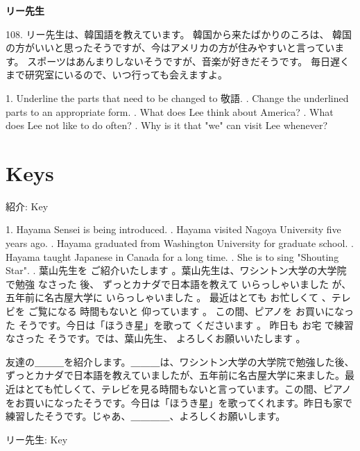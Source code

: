 \begin{center}
 \textbf{リー先生 }
\end{center}

\par{108.  リー先生は、韓国語を教えています。 韓国から来たばかりのころは、 \hfill\break
 韓国の方がいいと思ったそうですが、今はアメリカの方が住みやすいと言っています。 \hfill\break
 スポーツはあんまりしないそうですが、音楽が好きだそうです。 \hfill\break
 毎日遅くまで研究室にいるので、いつ行っても会えますよ。 }

\par{1. Underline the parts that need to be changed to 敬語. \hfill{}. Change the underlined parts to an appropriate form. \hfill{}. What does Lee think about America? \hfill{}. What does Lee not like to do often? \hfill{}. Why is it that "we" can visit Lee whenever? }
      
\section{Keys}
 
\par{紹介: Key }

\par{1. Hayama Sensei is being introduced. \hfill{}. Hayama visited Nagoya University five years ago. \hfill{}. Hayama graduated from Washington University for graduate school. \hfill{}. Hayama taught Japanese in Canada for a long time. \hfill{}. She is to sing "Shouting Star". \hfill{}.  葉山先生を ご紹介いたします 。葉山先生は、ワシントン大学の大学院で勉強 なさった 後、 \hfill\break
 ずっとカナダで日本語を教えて いらっしゃいました が、五年前に名古屋大学に いらっしゃいました 。 \hfill\break
 最近はとても お忙しくて 、テレビを ご覧になる 時間もないと 仰っています 。 \hfill\break
 この間、ピアノを お買いになった そうです。今日は「ほうき星」を歌って くださいます 。 \hfill\break
 昨日も お宅 で練習 なさった そうです。では、葉山先生、 よろしくお願いいたします 。 }

\par{友達の＿＿＿を紹介します。＿＿＿は、ワシントン大学の大学院で勉強した後、ずっとカナダで日本語を教えていましたが、五年前に名古屋大学に来ました。最近はとても忙しくて、テレビを見る時間もないと言っています。この間、ピアノをお買いになったそうです。今日は「ほうき星」を歌ってくれます。昨日も家で練習したそうです。じゃあ、＿＿＿＿、よろしくお願いします。 }

\par{リー先生: Key }

